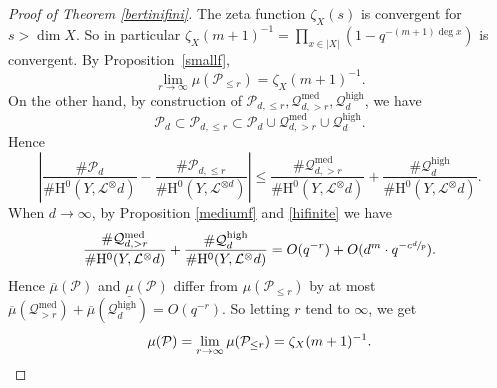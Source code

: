 \documentclass[11pt]{article}
\numberwithin{equation}{section}
\theoremstyle{plain}
\theoremstyle{definition}
\newcommand{\ho}{\mathrm{H}}
\newcommand{\li}{\mathcal{L}}
\begin{document}
\begin{proof}[Proof of Theorem \ref{bertinifini}]
The zeta function $\zeta_X(s)$ is convergent for $s>\dim X$. So in particular $\zeta_X(m+1)^{-1}=\prod_{x\in |X|}(1-q^{-(m+1)\deg x})$ is convergent. By Proposition~\ref{smallf},
\[
\lim_{r\to \infty}\mu(\mathcal{P}_{\leq r})=\zeta_X(m+1)^{-1}.
\]
On the other hand, by construction of $\mathcal{P}_{d,\leq r},\mathcal{Q}_{d, >r}^{\mathrm{med}},\mathcal{Q}_{d}^{\mathrm{high}}$, we have
\[
\mathcal{P}_{d} \subset \mathcal{P}_{d,\leq r} \subset \mathcal{P}_{d}\cup \mathcal{Q}_{d, >r}^{\mathrm{med}}\cup \mathcal{Q}_{d}^{\mathrm{high}}.
\]
Hence
\[
\left| \frac{ \#\mathcal{P}_{d}}{\# \ho^0(Y, \mathcal{L}^\otimes{d})} -\frac{\#\mathcal{P}_{d,\leq r}}{\#\ho^0(Y, \li^{\otimes d})} \right|\leq \frac{ \#\mathcal{Q}_{d, >r}^{\mathrm{med}}}{\# \ho^0(Y, \mathcal{L}^\otimes{d})}+\frac{ \#\mathcal{Q}_{d}^{\mathrm{high}}}{\# \ho^0(Y, \mathcal{L}^\otimes{d})}.
\]
When $d\to \infty$, by Proposition \ref{mediumf} and \ref{hifinite} we have
\[
\frac{ \#\mathcal{Q}_{d, >r}^{\mathrm{med}}}{\# \ho^0(Y, \mathcal{L}^\otimes{d})}+\frac{ \#\mathcal{Q}_{d}^{\mathrm{high}}}{\# \ho^0(Y, \mathcal{L}^\otimes{d})}
=O(q^{-r})+O(d^{m}\cdot q^{-c\sfrac{d}{p}}).
\]
Hence $\overline{\mu}(\mathcal{P})$ and $\underline{\mu}(\mathcal{P})$ differ from $\mu(\mathcal{P}_{\leq r})$ by at most $\overline{\mu}(\mathcal{Q}_{>r}^{\mathrm{med}})+\overline{\mu}(\mathcal{Q}_{d}^{\mathrm{high}})=O(q^{-r})$. So letting $r$ tend to $\infty$, we get
\[
\mu(\mathcal{P})=\lim_{r\to \infty}\mu(\mathcal{P}_{\leq r})=\zeta_X(m+1)^{-1}.\qedhere
\]
\end{proof}

\end{document}
